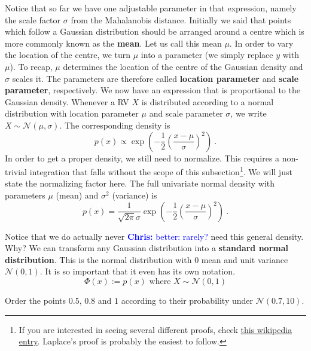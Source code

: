 \documentclass[a4paper,11pt,leqno]{report}\usepackage[]{graphicx}\usepackage[]{color}
\newcommand{\N}[2]{\mathcal{N}\left( #1, #2 \right)}
\newcommand{\chris}[1]{ \textcolor{blue}{\textbf{Chris:} #1}}
\begin{document}
Notice that so far we have one adjustable parameter in that expression, namely the scale factor $ \sigma $ from the Mahalanobis distance. Initially we said
that points which follow a Gaussian distribution should be arranged around a centre which is more commonly known as the \textbf{mean}. 
Let us call this mean $ \mu $. In order to vary the location of the centre,
we turn $ \mu $ into a parameter (we simply replace $ y $ with $ \mu $). To recap, $ \mu $ determines the location
of the centre of the Gaussian density and $ \sigma $ scales it. The parameters are therefore called \textbf{location parameter} and \textbf{scale parameter}, respectively.
We now have an expression that is proportional to the Gaussian density. Whenever a RV $ X $ is distributed according to a normal distribution with location parameter
$ \mu $ and scale parameter $ \sigma $, we write $ X \sim \N{\mu}{\sigma} $. The corresponding density is
\begin{equation}
p(x) \propto \exp\left(-\frac{1}{2} \left(\frac{x - \mu}{\sigma}\right)^{2} \right) \ .
\end{equation}
In order to get a proper density, we still need to normalize. This requires a non-trivial integration that falls without the scope of this subsection\footnote{If
you are interested in seeing several different proofs, check \href{https://en.wikipedia.org/wiki/Gaussian_integral}{this wikipedia entry}. Laplace's proof is probably the easiest to follow.}. We
will just state the normalizing factor here. The full univariate normal density with parameters $ \mu $ (mean) and $ \sigma^{2} $ (variance) is
\begin{equation}
p(x) = \frac{1}{\sqrt{2\pi}\sigma} \exp\left(-\frac{1}{2} \left(\frac{x - \mu}{\sigma}\right)^{2} \right) \ .
\end{equation}

Notice that we do actually never \chris{better: rarely?} need this general density. Why? We can transform any Gaussian distribution into a \textbf{standard normal distribution}. This is 
the normal distribution with 0 mean and unit variance $ \N{0}{1} $. It is so important that it even has its own notation. 
\begin{equation}
\Phi(x) := p(x) \mbox{ where } X \sim \N{0}{1}
\end{equation}

\begin{Exercise}
Order the points $ 0.5 $, $ 0.8 $ and $ 1 $ according to their probability under $ \N{0.7}{10} $.
\end{Exercise}
\end{document}
